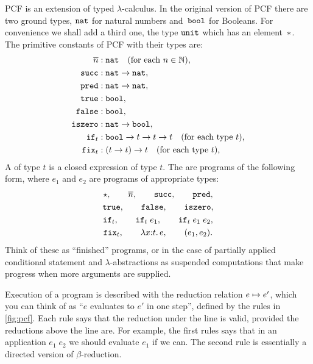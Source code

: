 PCF is an extension of typed $\lambda$-calculus. In the original version
of PCF there are two ground types, $\mathtt{nat}$ for natural numbers
and~$\mathtt{bool}$ for Booleans. For convenience we shall add a third one,
the type $\mathtt{unit}$ which has an element~${*}$. The primitive constants
of PCF with their types are:
%
\begin{align*}
  \overline{n} &: \mathtt{nat} \quad \text{(for each $n \in \mathbb{N}$),} \\
  \mathtt{succ} &: \mathtt{nat} \to \mathtt{nat}, \\
  \mathtt{pred} &: \mathtt{nat} \to \mathtt{nat}, \\
  \mathtt{true} &: \mathtt{bool}, \\
  \mathtt{false} &: \mathtt{bool}, \\
  \mathtt{iszero} &: \mathtt{nat} \to \mathtt{bool}, \\
  \mathtt{if}_t &: \mathtt{bool} \to t \to t \to t \quad\text{(for each type $t$),}\\
  \mathtt{fix}_t &: (t \to t) \to t \quad\text{(for each type $t$),}
\end{align*}
%
A  of type $t$ is a closed expression of type $t$. The
 are programs of the following form, where $e_1$ and
$e_2$ are programs of appropriate types:
%
\begin{gather*}
  \star,\qquad \overline{n},\qquad \mathtt{succ},\qquad \mathtt{pred},\\
  \mathtt{true},\qquad \mathtt{false},\qquad \mathtt{iszero},\\
  \mathtt{if}_t,\qquad \mathtt{if}_t \; e_1,\qquad \mathtt{if}_t \; e_1\; e_2,\\
  \mathtt{fix}_t,\qquad \lambda x {:} t .\,e,\qquad (e_1, e_2).
\end{gather*}
%
Think of these as ``finished'' programs, or in the case of partially
applied conditional statement and $\lambda$-abstractions as suspended
computations that make progress when more arguments are supplied.

Execution of a program is described with the reduction relation $e
\mapsto e'$, which you can think of as ``$e$ evaluates to $e'$ in one
step'', defined by the rules in \cref{fig:pcf}. Each rule says
that the reduction under the line is valid, provided the reductions
above the line are. For example, the first rules says that in an
application $e_1\;e_2$ we should evaluate $e_1$ if we can. The second
rule is essentially a directed version of $\beta$-reduction.

